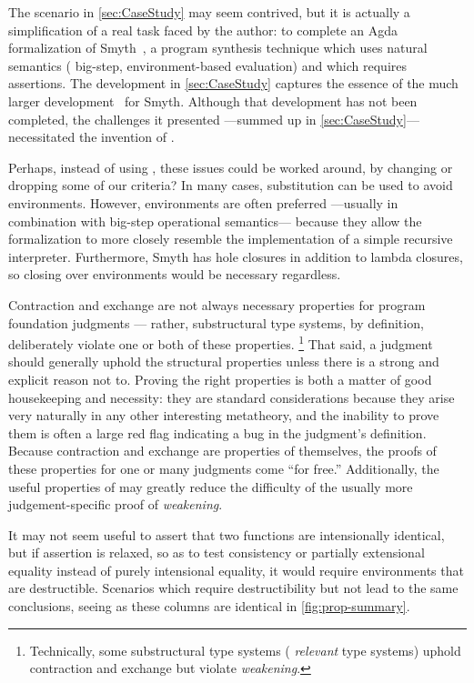 
The scenario in \autoref{sec:CaseStudy} may seem contrived, but it is actually a simplification of a real task faced by the author:
%
to complete an Agda formalization of Smyth~\citep{smyth}, a program synthesis technique which uses
natural semantics (\ie{} big-step, environment-based evaluation) and which requires assertions.
%
The development in \autoref{sec:CaseStudy} captures the essence of the much larger development~\citep{github:smyth:agda} for Smyth.
%
Although that development has not been completed, the challenges it presented ---summed up in \autoref{sec:CaseStudy}--- necessitated the invention of \dds.

Perhaps, instead of using \dds, these issues could be worked around, by changing or dropping some of our criteria?
In many cases, substitution can be used to avoid environments. However, environments are often preferred ---usually in combination with big-step operational semantics--- because
they allow the formalization to more closely resemble the implementation of a simple recursive interpreter. Furthermore,
Smyth has hole closures in addition to lambda closures, so closing over environments would be necessary regardless.

Contraction and exchange are not always necessary properties for program foundation judgments ---
rather, substructural type systems, by definition, deliberately violate one or both of these properties.%
\footnote{\hspace{0.01in}Technically, some substructural type systems (\eg{} \emph{relevant} type systems) uphold contraction and exchange but violate \emph{weakening}.}
That said, a judgment should generally uphold the structural properties unless there is a strong and explicit
reason not to. Proving the right properties
is both a matter of good housekeeping and necessity: they are standard
considerations because they arise very naturally in any other
interesting metatheory, and the inability to prove them is often a large red flag indicating a bug in the judgment's definition.
Because contraction and exchange are properties of \dds{} themselves,
the proofs of these properties for one or many judgments come ``for free.''
Additionally, the useful properties of \dds{} may greatly reduce the difficulty of the usually
more judgement-specific proof of \emph{weakening}.

It may not seem useful to assert that two functions are intensionally identical, but if assertion is relaxed,
so as to test consistency or partially extensional equality instead of purely intensional equality,
it would require environments that are destructible.
Scenarios which require destructibility but not \EqDec{} lead to the same conclusions,
seeing as these columns are identical in \autoref{fig:prop-summary}.

